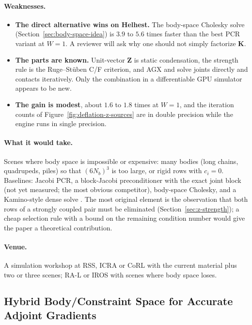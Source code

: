 \paragraph{Weaknesses.}
\begin{itemize}
  \item \textbf{The direct alternative wins on Helhest.} The body-space
    Cholesky solve (Section~\ref{sec:body-space-idea}) is $3.9$ to $5.6$
    times faster than the best PCR variant at $W = 1$. A reviewer will ask
    why one should not simply factorize $\mathbf{K}$.
  \item \textbf{The parts are known.} Unit-vector $\mathbf{Z}$ is static
    condensation, the strength rule is the Ruge--St\"uben C/F criterion,
    and AGX and \citet{peiret2019schur} solve joints directly and
    contacts iteratively. Only the combination in a differentiable GPU
    simulator appears to be new.
  \item \textbf{The gain is modest}, about $1.6$ to $1.8$ times at
    $W = 1$, and the iteration counts of Figure~\ref{fig:deflation-z-sources}
    are in double precision while the engine runs in single precision.
\end{itemize}

\paragraph{What it would take.}
Scenes where body space is impossible or expensive: many bodies (long
chains, quadrupeds, piles) so that $(6N_b)^3$ is too large, or rigid rows
with $c_i = 0$. Baselines: Jacobi PCR, a block-Jacobi preconditioner with
the exact joint block (not yet measured; the most obvious competitor),
body-space Cholesky, and a Kamino-style dense solve \citep{tsounis2026kamino}.
The most original element is the observation that both rows of a strongly
coupled pair must be eliminated (Section~\ref{sec:z-strength}); a cheap
selection rule with a bound on the remaining condition number would give
the paper a theoretical contribution.

\paragraph{Venue.}
A simulation workshop at RSS, ICRA or CoRL with the current material plus
two or three scenes; RA-L or IROS with scenes where body space loses.

\clearpage
\subsection{Hybrid Body/Constraint Space for Accurate Adjoint Gradients}
\label{sec:idea-hybrid-adjoint}

